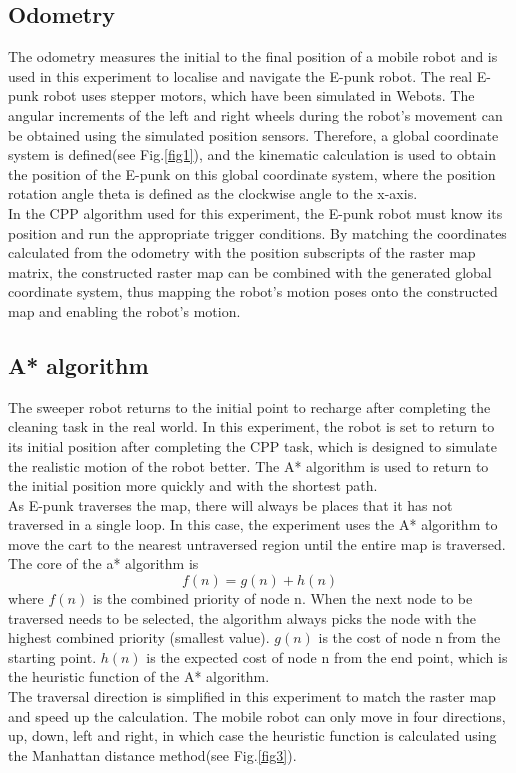\documentclass[conference]{IEEEtran}
\begin{document}
\subsection{Odometry}

The odometry measures the initial to the final position of a mobile robot and is used in this experiment to localise and navigate the E-punk robot. The real E-punk robot uses stepper motors, which have been simulated in Webots. The angular increments of the left and right wheels during the robot's movement can be obtained using the simulated position sensors. Therefore, a global coordinate system is defined(see Fig.\ref{fig1}), and the kinematic calculation\cite{dudek2010computational} is used to obtain the position of the E-punk on this global coordinate system, where the position rotation angle theta is defined as the clockwise angle to the x-axis.\\
In the CPP algorithm used for this experiment, the E-punk robot must know its position and run the appropriate trigger conditions. By matching the coordinates calculated from the odometry with the position subscripts of the raster map matrix, the constructed raster map can be combined with the generated global coordinate system, thus mapping the robot's motion poses onto the constructed map and enabling the robot's motion.

\subsection{A* algorithm}
The sweeper robot returns to the initial point to recharge after completing the cleaning task in the real world. In this experiment, the robot is set to return to its initial position after completing the CPP task, which is designed to simulate the realistic motion of the robot better. The A* algorithm\cite{hart1968formal} is used to return to the initial position more quickly and with the shortest path.\\
As E-punk traverses the map, there will always be places that it has not traversed in a single loop. In this case, the experiment uses the A* algorithm to move the cart to the nearest untraversed region until the entire map is traversed.\\
The core of the a* algorithm is
\begin{equation}
    f(n) = g(n) + h(n)
\end{equation}
where $f(n)$ is the combined priority of node n. When the next node to be traversed needs to be selected, the algorithm always picks the node with the highest combined priority (smallest value). $g(n)$ is the cost of node n from the starting point. $h(n)$ is the expected cost of node n from the end point, which is the heuristic function of the A* algorithm.\\
The traversal direction is simplified in this experiment to match the raster map and speed up the calculation. The mobile robot can only move in four directions, up, down, left and right, in which case the heuristic function is calculated using the Manhattan distance method(see Fig.\ref{fig3}).
\end{document}
